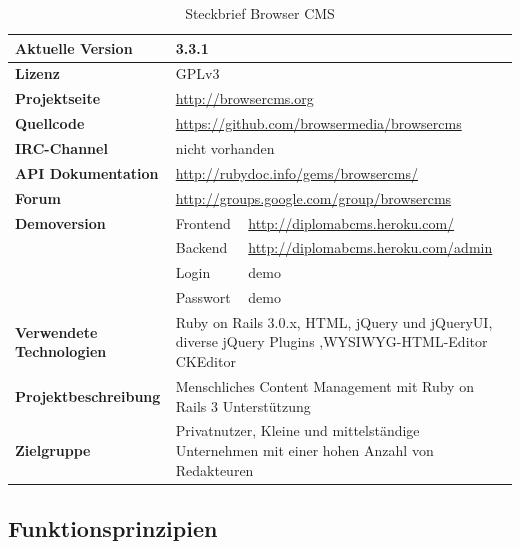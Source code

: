 \begin{table}[!h]
\caption{Steckbrief Browser CMS}
\begin{tabular}[!ht]{|l|l|l|}
\hline
\textbf{Aktuelle Version} & \multicolumn{2}{p{10cm}|}{3.3.1} \\
\hline
\textbf{Lizenz} & \multicolumn{2}{p{10cm}|}{GPLv3} \\
\hline
\textbf{Projektseite} & \multicolumn{2}{p{10cm}|}{\href{http://browsercms.org}{http://browsercms.org}} \\
\hline
\textbf{Quellcode} & \multicolumn{2}{p{10cm}|}{\href{https://github.com/browsermedia/browsercms
}{https://github.com/browsermedia/browsercms}} \\
\hline
\textbf{IRC-Channel} & \multicolumn{2}{p{10cm}|}{nicht vorhanden} \\
\hline
\textbf{API Dokumentation} & \multicolumn{2}{p{10cm}|}{\href{http://rubydoc.info/gems/browsercms/
}{http://rubydoc.info/gems/browsercms/}} \\
\hline
\textbf{Forum} & \multicolumn{2}{p{10cm}|}{\href{http://groups.google.com/group/browsercms}{http://groups.google.com/group/browsercms}} \\
\hline
\textbf{Demoversion} & Frontend & \href{http://diplomabcms.heroku.com/}{http://diplomabcms.heroku.com/} \\
\cline{2-3}
& Backend & \href{http://diplomabcms.heroku.com/cms}{http://diplomabcms.heroku.com/admin} \\
\cline{2-3}
& Login & demo \\
\cline{2-3}
& Passwort & demo \\
\hline
\textbf{Verwendete Technologien} & \multicolumn{2}{p{10cm}|}{Ruby on Rails 3.0.x, HTML, jQuery und jQueryUI, diverse jQuery Plugins ,WYSIWYG-HTML-Editor CKEditor} \\
\hline
\textbf{Projektbeschreibung} & \multicolumn{2}{p{10cm}|}{Menschliches Content Management mit Ruby on Rails 3 Unterstützung} \\
\hline
\textbf{Zielgruppe} & \multicolumn{2}{p{10cm}|}{Privatnutzer, Kleine und mittelständige Unternehmen mit einer hohen Anzahl von Redakteuren} \\
\hline
\end{tabular}
\end{table}
\subsection{Funktionsprinzipien}

